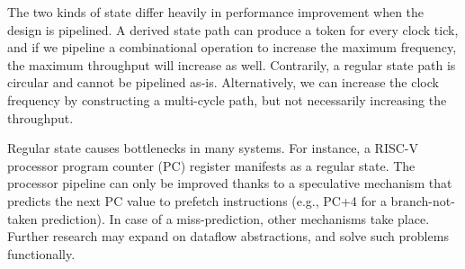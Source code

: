 The two kinds of state differ heavily in performance improvement when the design is pipelined. A derived state path can produce a token for every clock tick, and if we pipeline a combinational operation to increase the maximum frequency, the maximum throughput will increase as well. Contrarily, a regular state path is circular and cannot be pipelined as-is. Alternatively, we can increase the clock frequency by constructing a multi-cycle path, but not necessarily increasing the throughput.

Regular state causes bottlenecks in many systems. For instance, a RISC-V processor program counter (PC) register manifests as a regular state. The processor pipeline can only be improved thanks to a speculative mechanism that predicts the next PC value to prefetch instructions (e.g., PC+4 for a branch-not-taken prediction). In case of a miss-prediction, other mechanisms take place. Further research may expand on dataflow abstractions, and solve such problems functionally.





